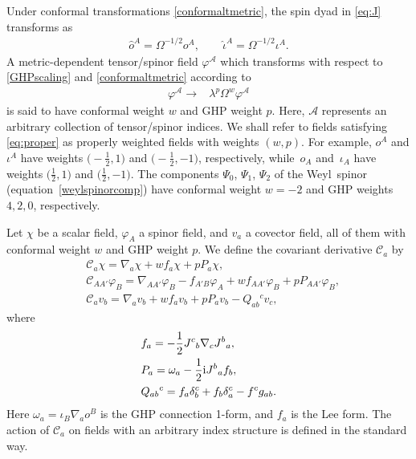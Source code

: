 \documentclass[10pt,a4paper]{amsart}
\numberwithin{equation}{section}
\begin{document}
Under conformal transformations \eqref{conformaltmetric}, the spin dyad in \eqref{eq:J} transforms as
\begin{align}\label{conformaloiota}
\hat{o}^{A}=\Omega^{-1/2}o^{A}, \qquad \hat\iota^A=\Omega^{-1/2}\iota^A.
\end{align}
A metric-dependent tensor/spinor field $\varphi^{\mathcal{A}}$ which transforms with respect to \eqref{GHPscaling} and \eqref{conformaltmetric} according to
\begin{align} \label{eq:proper}
\varphi^{\mathcal{A}} \to{}& \lambda^p \Omega^w \varphi^{\mathcal{A}}
\end{align}
is said to have conformal weight $w$ and GHP weight $p$. Here, $\mathcal{A}$ represents an arbitrary collection of tensor/spinor indices. We shall refer to fields satisfying \eqref{eq:proper} as properly weighted fields with weights $(w,p)$.
For example, $o^{A}$ and $\iota^{A}$ have weights $\bigl(-\frac{1}{2},1\bigr)$ and $\bigl(-\frac{1}{2},-1\bigr)$, respectively, while~$o_{A}$ and~$\iota_{A}$ have weights $\bigl(\frac{1}{2},1\bigr)$ and $\bigl(\frac{1}{2},-1\bigr)$. The components $\Psi_0$, $\Psi_1$, $\Psi_2$ of the Weyl~spinor (equation~\eqref{weylspinorcomp}) have conformal weight $w=-2$ and GHP weights $4, 2, 0$, respectively.

Let $\chi$ be a scalar field, $\varphi_{A}$ a spinor field, and $v_{a}$ a covector field, all of them with conformal weight $w$ and GHP weight $p$.
We define the covariant derivative $\mathcal{C}_{a}$ by
\begin{align*} %
&\mathcal{C}_{a}\chi= \nabla_{a}\chi + wf_{a}\chi + p P_{a}\chi, \\
&\mathcal{C}_{AA'}\varphi_{B}= \nabla_{AA'}\varphi_{B} - f_{A'B}\varphi_{A} + wf_{AA'}\varphi_{B} + p P_{AA'}\varphi_{B}, \\
&\mathcal{C}_{a}v_b= \nabla_{a}v_{b} + wf_{a}v_{b} + p P_{a}v_{b} - Q_{ab}{}^{c}v_{c},
\end{align*}
where
\begin{align}
&f_{a} = -\frac{1}{2}J^{c}{}_{b}\nabla_{c}J^{b}{}_{a}, \label{LeeForm} \\
&P_{a} = \omega_{a} -\frac{1}{2} {\rm i} J^{b}{}_{a}f_{b}, \label{1formP} \\
&Q_{ab}{}^{c} = f_{a}\delta^{c}_{b} + f_{b}\delta^{c}_{a} - f^{c}g_{ab}. \nonumber
\end{align}
Here $\omega_{a}=\iota_{B}\nabla_{a}o^{B}$ is the GHP connection 1-form, and $f_{a}$ is the Lee form.
The action of $\mathcal{C}_{a}$ on fields with an arbitrary index structure is defined in the standard way.
\end{document}
